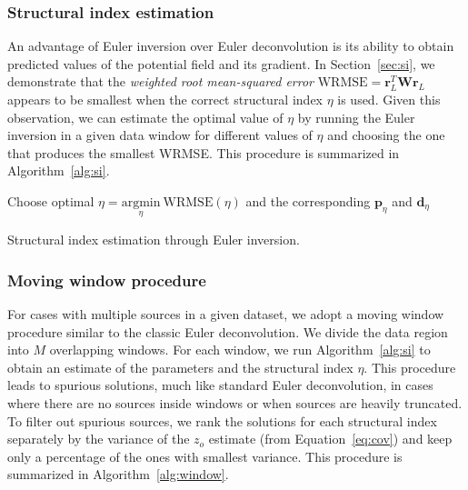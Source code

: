 \subsubsection{Structural index estimation}

An advantage of Euler inversion over Euler deconvolution is its ability to obtain
predicted values of the potential field and its gradient.
In Section~\ref{sec:si}, we demonstrate that the \textit{weighted root
mean-squared error} $\text{WRMSE} = \mathbf{r}_L^T\mathbf{W}\mathbf{r}_L$
appears to be smallest when the correct structural index $\eta$ is used.
Given this observation, we can estimate the optimal value of $\eta$ by running
the Euler inversion in a given data window for different values of $\eta$ and
choosing the one that produces the smallest WRMSE.
This procedure is summarized in Algorithm~\ref{alg:si}.

\begin{algorithm}[!h]
  Choose optimal $\eta = \underset{\eta}{\text{argmin}}\ \text{WRMSE}(\eta)$ and the corresponding
  $\mathbf{p}_{\eta}$ and $\mathbf{d}_{\eta}$
  \;
  \BlankLine
  \caption{Structural index estimation through Euler inversion.}
  \label{alg:si}
\end{algorithm}

\subsubsection{Moving window procedure}

For cases with multiple sources in a given dataset, we adopt a moving window
procedure similar to the classic Euler deconvolution.
We divide the data region into $M$ overlapping windows.
For each window, we run Algorithm~\ref{alg:si} to obtain an estimate of the
parameters and the structural index $\eta$.
This procedure leads to spurious solutions, much like standard Euler
deconvolution, in cases where there are no sources inside windows or when
sources are heavily truncated.
To filter out spurious sources, we rank the solutions for each structural index
separately by the variance of the $z_o$ estimate (from Equation~\ref{eq:cov})
and keep only a percentage of the ones with smallest variance.
This procedure is summarized in Algorithm~\ref{alg:window}.

